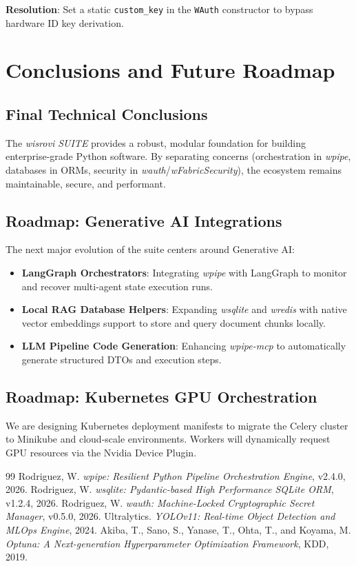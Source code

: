 \documentclass[12pt,a4paper]{report}
\begin{document}
\textbf{Resolution}: Set a static \texttt{custom\_key} in the \texttt{WAuth} constructor to bypass hardware ID key derivation.

\cleardoublepage
\chapter{Conclusions and Future Roadmap}

\section{\sffamily Final Technical Conclusions}
The \textit{wisrovi SUITE} provides a robust, modular foundation for building enterprise-grade Python software. By separating concerns (orchestration in \textit{wpipe}, databases in ORMs, security in \textit{wauth}/\textit{wFabricSecurity}), the ecosystem remains maintainable, secure, and performant.

\section{\sffamily Roadmap: Generative AI Integrations}
The next major evolution of the suite centers around Generative AI:
\begin{itemize}
    \item \textbf{LangGraph Orchestrators}: Integrating \textit{wpipe} with LangGraph to monitor and recover multi-agent state execution runs.
    \item \textbf{Local RAG Database Helpers}: Expanding \textit{wsqlite} and \textit{wredis} with native vector embeddings support to store and query document chunks locally.
    \item \textbf{LLM Pipeline Code Generation}: Enhancing \textit{wpipe-mcp} to automatically generate structured DTOs and execution steps.
\end{itemize}

\section{\sffamily Roadmap: Kubernetes GPU Orchestration}
We are designing Kubernetes deployment manifests to migrate the Celery cluster to Minikube and cloud-scale environments. Workers will dynamically request GPU resources via the Nvidia Device Plugin.

\cleardoublepage
\begin{thebibliography}{99}
 Rodriguez, W. \emph{wpipe: Resilient Python Pipeline Orchestration Engine}, v2.4.0, 2026.
 Rodriguez, W. \emph{wsqlite: Pydantic-based High Performance SQLite ORM}, v1.2.4, 2026.
 Rodriguez, W. \emph{wauth: Machine-Locked Cryptographic Secret Manager}, v0.5.0, 2026.
 Ultralytics. \emph{YOLOv11: Real-time Object Detection and MLOps Engine}, 2024.
 Akiba, T., Sano, S., Yanase, T., Ohta, T., and Koyama, M. \emph{Optuna: A Next-generation Hyperparameter Optimization Framework}, KDD, 2019.
\end{thebibliography}
\end{document}
